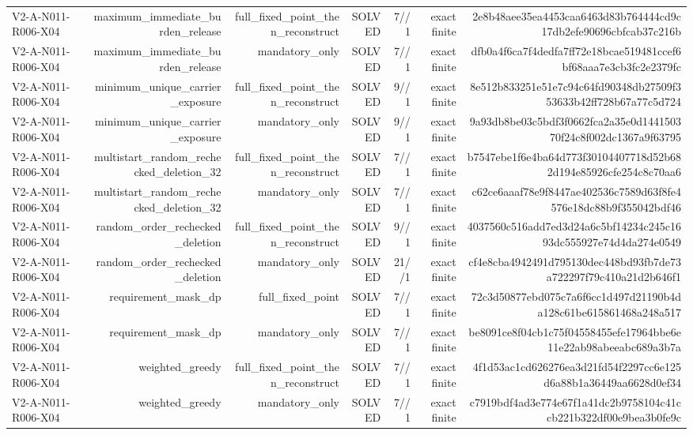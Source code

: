 {\begin{longtable}{lrrrrrr}
V2-A-N011-R006-X04 & maximum\_immediate\_burden\_release & full\_fixed\_point\_then\_reconstruct & SOLVED & 7//1 & exact finite & 2e8b48aee35ea4453caa6463d83b764444cd9c17db2efe90696cbfcab37c216b \\
V2-A-N011-R006-X04 & maximum\_immediate\_burden\_release & mandatory\_only & SOLVED & 7//1 & exact finite & dfb0a4f6ca7f4dedfa7ff72e18bcae519481ccef6bf68aaa7e3cb3fc2e2379fc \\
V2-A-N011-R006-X04 & minimum\_unique\_carrier\_exposure & full\_fixed\_point\_then\_reconstruct & SOLVED & 9//1 & exact finite & 8e512b833251e51e7c94c64fd90348db27509f353633b42ff728b67a77c5d724 \\
V2-A-N011-R006-X04 & minimum\_unique\_carrier\_exposure & mandatory\_only & SOLVED & 9//1 & exact finite & 9a93db8be03c5bdf3f0662fca2a35e0d144150370f24c8f002dc1367a9f63795 \\
V2-A-N011-R006-X04 & multistart\_random\_rechecked\_deletion\_32 & full\_fixed\_point\_then\_reconstruct & SOLVED & 7//1 & exact finite & b7547ebe1f6e4ba64d773f30104407718d52b682d194e85926cfe254c8c70aa6 \\
V2-A-N011-R006-X04 & multistart\_random\_rechecked\_deletion\_32 & mandatory\_only & SOLVED & 7//1 & exact finite & c62ce6aaaf78e9f8447ae402536c7589d63f8fe4576e18dc88b9f355042bdf46 \\
V2-A-N011-R006-X04 & random\_order\_rechecked\_deletion & full\_fixed\_point\_then\_reconstruct & SOLVED & 9//1 & exact finite & 4037560c516add7ed3d24a6c5bf14234c245c1693dc555927e74d4da274e0549 \\
V2-A-N011-R006-X04 & random\_order\_rechecked\_deletion & mandatory\_only & SOLVED & 21//1 & exact finite & cf4e8cba4942491d795130dec448bd93fb7de73a722297f79c410a21d2b646f1 \\
V2-A-N011-R006-X04 & requirement\_mask\_dp & full\_fixed\_point & SOLVED & 7//1 & exact finite & 72c3d50877ebd075c7a6f6cc1d497d21190b4da128c61be615861468a248a517 \\
V2-A-N011-R006-X04 & requirement\_mask\_dp & mandatory\_only & SOLVED & 7//1 & exact finite & be8091ce8f04cb1c75f04558455efe17964bbe6e11e22ab98abeeabc689a3b7a \\
V2-A-N011-R006-X04 & weighted\_greedy & full\_fixed\_point\_then\_reconstruct & SOLVED & 7//1 & exact finite & 4f1d53ac1cd626276ea3d21fd54f2297cc6e125d6a88b1a36449aa6628d0ef34 \\
V2-A-N011-R006-X04 & weighted\_greedy & mandatory\_only & SOLVED & 7//1 & exact finite & c7919bdf4ad3e774e67f1a41dc2b9758104c41ccb221b322df00e9bea3b0fe9c \\

\end{longtable}}
